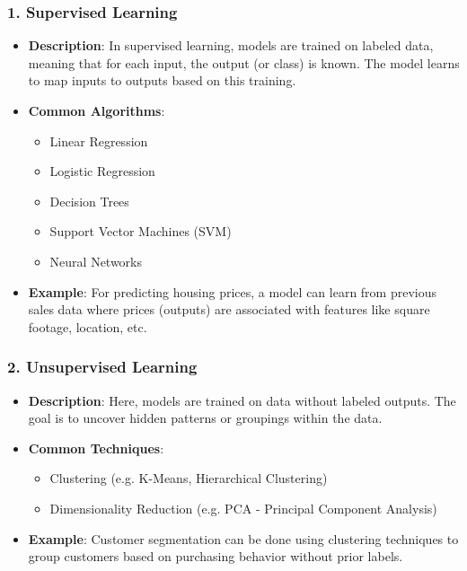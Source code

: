 \documentclass[aspectratio=169]{beamer}
\begin{document}
\begin{frame}[fragile]
    \frametitle{1. Supervised Learning}
    \begin{itemize}
        \item \textbf{Description}: In supervised learning, models are trained on labeled data, meaning that for each input, the output (or class) is known. The model learns to map inputs to outputs based on this training.
        \item \textbf{Common Algorithms}:
        \begin{itemize}
            \item Linear Regression
            \item Logistic Regression
            \item Decision Trees
            \item Support Vector Machines (SVM)
            \item Neural Networks
        \end{itemize}
        \item \textbf{Example}: For predicting housing prices, a model can learn from previous sales data where prices (outputs) are associated with features like square footage, location, etc.
    \end{itemize}
\end{frame}

\begin{frame}[fragile]
    \frametitle{2. Unsupervised Learning}
    \begin{itemize}
        \item \textbf{Description}: Here, models are trained on data without labeled outputs. The goal is to uncover hidden patterns or groupings within the data.
        \item \textbf{Common Techniques}:
        \begin{itemize}
            \item Clustering (e.g. K-Means, Hierarchical Clustering)
            \item Dimensionality Reduction (e.g. PCA - Principal Component Analysis)
        \end{itemize}
        \item \textbf{Example}: Customer segmentation can be done using clustering techniques to group customers based on purchasing behavior without prior labels.
    \end{itemize}
\end{frame}
\end{document}
